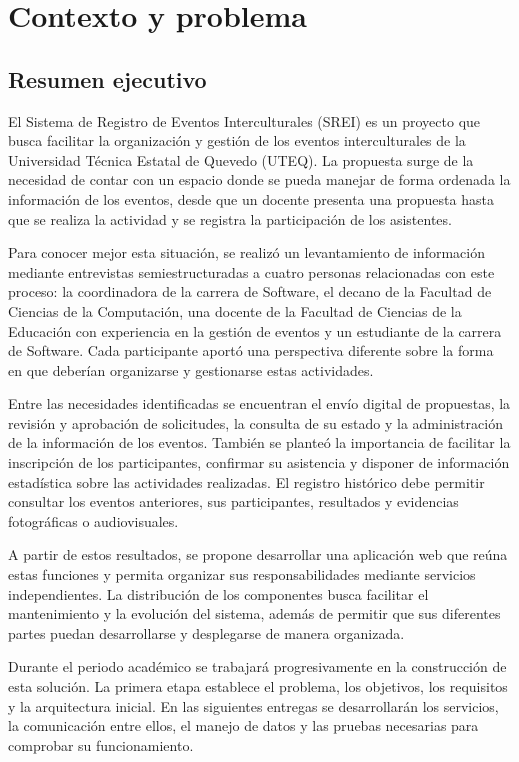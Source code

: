 
\section{Contexto y problema}

\subsection{Resumen ejecutivo}

El Sistema de Registro de Eventos Interculturales (SREI) es un proyecto que busca facilitar la organización y gestión de los eventos interculturales de la Universidad Técnica Estatal de Quevedo (UTEQ). La propuesta surge de la necesidad de contar con un espacio donde se pueda manejar de forma ordenada la información de los eventos, desde que un docente presenta una propuesta hasta que se realiza la actividad y se registra la participación de los asistentes.

Para conocer mejor esta situación, se realizó un levantamiento de información mediante entrevistas semiestructuradas a cuatro personas relacionadas con este proceso: la coordinadora de la carrera de Software, el decano de la Facultad de Ciencias de la Computación, una docente de la Facultad de Ciencias de la Educación con experiencia en la gestión de eventos y un estudiante de la carrera de Software. Cada participante aportó una perspectiva diferente sobre la forma en que deberían organizarse y gestionarse estas actividades.

Entre las necesidades identificadas se encuentran el envío digital de propuestas, la revisión y aprobación de solicitudes, la consulta de su estado y la administración de la información de los eventos. También se planteó la importancia de facilitar la inscripción de los participantes, confirmar su asistencia y disponer de información estadística sobre las actividades realizadas. El registro histórico debe permitir consultar los eventos anteriores, sus participantes, resultados y evidencias fotográficas o audiovisuales.

A partir de estos resultados, se propone desarrollar una aplicación web que reúna estas funciones y permita organizar sus responsabilidades mediante servicios independientes. La distribución de los componentes busca facilitar el mantenimiento y la evolución del sistema, además de permitir que sus diferentes partes puedan desarrollarse y desplegarse de manera organizada.

Durante el periodo académico se trabajará progresivamente en la construcción de esta solución. La primera etapa establece el problema, los objetivos, los requisitos y la arquitectura inicial. En las siguientes entregas se desarrollarán los servicios, la comunicación entre ellos, el manejo de datos y las pruebas necesarias para comprobar su funcionamiento.

